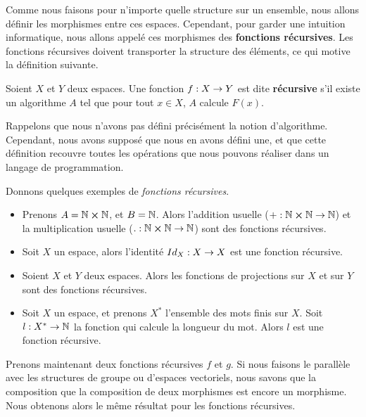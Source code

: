 Comme nous faisons pour n'importe quelle structure sur un ensemble, nous allons
définir les morphismes entre ces espaces. Cependant, pour garder une intuition
informatique, nous allons appelé ces morphismes des \textbf{fonctions
récursives}. Les fonctions récursives doivent transporter la structure des
éléments, ce qui motive la définition suivante.

\begin{definition}
	Soient $X$ et $Y$ deux espaces.
	Une fonction $f : X \rightarrow Y$ est dite \textbf{récursive} s'il existe
	un algorithme $A$ tel que pour tout $x \in X$, $A$ calcule $F(x)$.
\end{definition}

Rappelons que nous n'avons pas défini précisément la notion d'algorithme.
Cependant, nous avons supposé que nous en avons défini une, et que cette
définition recouvre toutes les opérations que nous pouvons réaliser dans un
langage de programmation.

Donnons quelques exemples de \textit{fonctions récursives}.

\begin{exemple}
	\begin{itemize}
		\item Prenons $A = \mathbb{N} \cross \mathbb{N}$, et $B = \mathbb{N}$.
			Alors l'addition usuelle ($+ : \mathbb{N} \cross
			\mathbb{N} \rightarrow \mathbb{N}$) et la multiplication usuelle
			($. : \mathbb{N} \cross \mathbb{N} \rightarrow \mathbb{N}$) sont des
			fonctions récursives.
		\item Soit $X$ un espace, alors l'identité $Id_{X} : X \rightarrow X$
			est une fonction récursive.
		\item Soient $X$ et $Y$ deux espaces. Alors les fonctions de projections
			sur $X$ et sur $Y$ sont des fonctions récursives.
		\item Soit $X$ un espace, et prenons $X^{*}$ l'ensemble des mots finis
			sur $X$.
			Soit $l : X^{*} \rightarrow \mathbb{N}$ la fonction qui calcule la
			longueur du mot. Alors $l$ est une fonction récursive.
	\end{itemize}
\end{exemple}

Prenons maintenant deux fonctions récursives $f$ et $g$. Si nous faisons le
parallèle avec les structures de groupe ou d'espaces vectoriels, nous savons que
la composition que la composition de deux morphismes est encore un morphisme.
Nous obtenons alors le même résultat pour les fonctions récursives.

